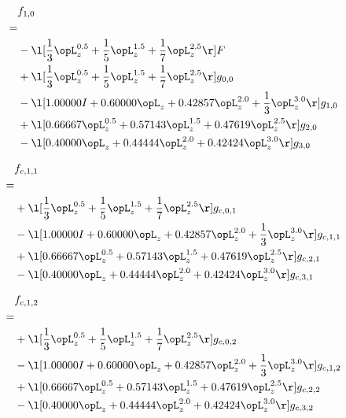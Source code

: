 \begin{alignat}{2} 
\label{eq:f_10_0} 
& f_{1,0} \nonumber \\ 
 = \\ 
& - \l[ \frac{1}{3} \opL_z^{0.5} + \frac{1}{5} \opL_z^{1.5} + \frac{1}{7} \opL_z^{2.5}  \r] F \nonumber \\ 
& + \l[ \frac{1}{3} \opL_z^{0.5} + \frac{1}{5} \opL_z^{1.5} + \frac{1}{7} \opL_z^{2.5}  \r] g_{0,0} \nonumber \\ 
& - \l[  1.00000 I +  0.60000 \opL_z +  0.42857 \opL_z^{2.0} + \frac{1}{3} \opL_z^{3.0}  \r] g_{1,0} \nonumber \\ 
& + \l[  0.66667 \opL_z^{0.5} +  0.57143 \opL_z^{1.5} +  0.47619 \opL_z^{2.5}  \r] g_{2,0} \nonumber \\ 
& - \l[  0.40000 \opL_z +  0.44444 \opL_z^{2.0} +  0.42424 \opL_z^{3.0}  \r] g_{3,0} \nonumber \\ 
\end{alignat} 


\begin{alignat}{2} 
\label{eq:f_11_0} 
& f_{c,1,1} \nonumber \\ 
 = \\ 
& + \l[ \frac{1}{3} \opL_z^{0.5} + \frac{1}{5} \opL_z^{1.5} + \frac{1}{7} \opL_z^{2.5}  \r] g_{c,0,1} \nonumber \\ 
& - \l[  1.00000 I +  0.60000 \opL_z +  0.42857 \opL_z^{2.0} + \frac{1}{3} \opL_z^{3.0}  \r] g_{c,1,1} \nonumber \\ 
& + \l[  0.66667 \opL_z^{0.5} +  0.57143 \opL_z^{1.5} +  0.47619 \opL_z^{2.5}  \r] g_{c,2,1} \nonumber \\ 
& - \l[  0.40000 \opL_z +  0.44444 \opL_z^{2.0} +  0.42424 \opL_z^{3.0}  \r] g_{c,3,1} \nonumber \\ 
\end{alignat} 


\begin{alignat}{2} 
\label{eq:f_12_0} 
& f_{c,1,2} \nonumber \\ 
 = \\ 
& + \l[ \frac{1}{3} \opL_z^{0.5} + \frac{1}{5} \opL_z^{1.5} + \frac{1}{7} \opL_z^{2.5}  \r] g_{c,0,2} \nonumber \\ 
& - \l[  1.00000 I +  0.60000 \opL_z +  0.42857 \opL_z^{2.0} + \frac{1}{3} \opL_z^{3.0}  \r] g_{c,1,2} \nonumber \\ 
& + \l[  0.66667 \opL_z^{0.5} +  0.57143 \opL_z^{1.5} +  0.47619 \opL_z^{2.5}  \r] g_{c,2,2} \nonumber \\ 
& - \l[  0.40000 \opL_z +  0.44444 \opL_z^{2.0} +  0.42424 \opL_z^{3.0}  \r] g_{c,3,2} \nonumber \\ 
\end{alignat} 


